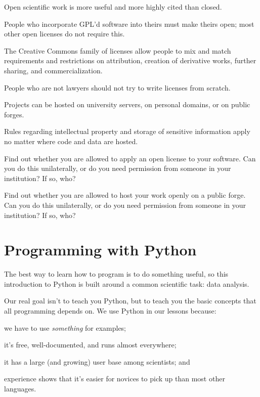 \documentclass{book}
\begin{document}
\begin{keypoints}
\begin{swcitemize}
\item
  Open scientific work is more useful and more highly cited than closed.
\item
  People who incorporate GPL'd software into theirs must make theirs
  open; most other open licenses do not require this.
\item
  The Creative Commons family of licenses allow people to mix and match
  requirements and restrictions on attribution, creation of derivative
  works, further sharing, and commercialization.
\item
  People who are not lawyers should not try to write licenses from
  scratch.
\item
  Projects can be hosted on university servers, on personal domains, or
  on public forges.
\item
  Rules regarding intellectual property and storage of sensitive
  information apply no matter where code and data are hosted.
\end{swcitemize}
\end{keypoints}

\begin{challenge}
  Find out whether you are allowed to apply an open license to your
  software. Can you do this unilaterally, or do you need permission from
  someone in your institution? If so, who?
\end{challenge}

\begin{challenge}
  Find out whether you are allowed to host your work openly on a public
  forge. Can you do this unilaterally, or do you need permission from
  someone in your institution? If so, who?
\end{challenge}

\chapter{Programming with Python}\label{s:python}

The best way to learn how to program is to do something useful, so this
introduction to Python is built around a common scientific task: data
analysis.

Our real goal isn't to teach you Python, but to teach you the basic
concepts that all programming depends on. We use Python in our lessons
because:

\begin{swcenumerate}
\item
  we have to use \emph{something} for examples;
\item
  it's free, well-documented, and runs almost everywhere;
\item
  it has a large (and growing) user base among scientists; and
\item
  experience shows that it's easier for novices to pick up than most
  other languages.
\end{swcenumerate}
\end{document}
